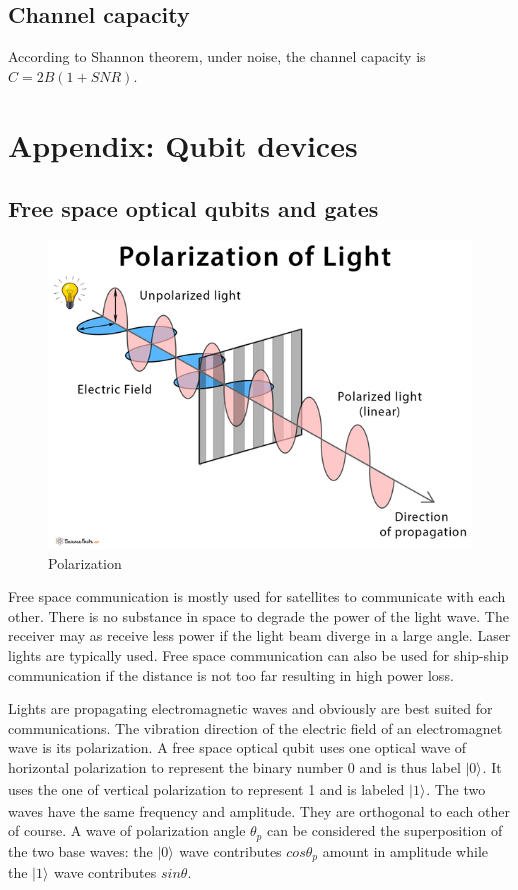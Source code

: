 \documentclass{book}
\newcommand{\keta}[2][]{\vert {#2} \rangle_{#1}}
\begin{document}
\section{Channel capacity}
According to Shannon theorem, under noise, the channel capacity is $C = 2B (1+SNR)$.


\chapter{Appendix: Qubit devices}\label{A-qubit}

\section{Free space optical qubits and gates}
\begin{figure}[h]
\includegraphics[width=12cm]{pic/Polarization-of-Light.jpg}
\caption{Polarization}
\label{Polarizer}
\end{figure}

Free space communication is mostly used for satellites to communicate with each other. There is no substance in space to degrade the power of the light wave. The receiver may as receive less power if the light beam diverge in a large angle. Laser lights are typically used. Free space communication can also be used for ship-ship communication if the distance is not too far resulting in high power loss.

Lights are propagating electromagnetic waves and obviously are best suited for communications. The vibration direction of the electric field of an electromagnet wave is its polarization. A free space optical qubit uses one optical wave of horizontal polarization to represent the binary number 0 and is thus label $\keta{0}$. It uses the one of vertical polarization to represent 1 and is labeled $\keta{1}$. The two waves have the same frequency and amplitude. They are orthogonal to each other of course. A wave of polarization angle $\theta_p$ can be considered the superposition of the two base waves: the $\keta{0}$ wave contributes $cos\theta_p$ amount in amplitude while the $\keta{1}$ wave contributes $sin\theta$.
\end{document}
